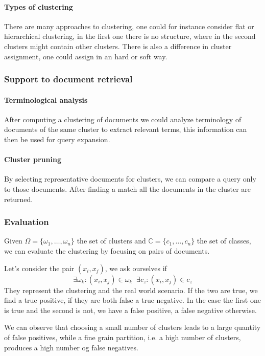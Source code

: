 \paragraph{Types of clustering}
There are many approaches to clustering, one could for instance 
consider flat or hierarchical clustering, in the first one there is no structure, where 
in the second clusters might contain other clusters. 
There is also a difference in cluster assignment, one could assign in an hard or soft way.

\subsubsection{Support to document retrieval}

\paragraph{Terminological analysis}
After computing a clustering of documents we could analyze terminology 
of documents of the same cluster to extract relevant terms, this 
information can then be used for query expansion.

\paragraph{Cluster pruning}
By selecting representative documents for clusters, we can compare a query 
only to those documents. After finding a match all the documents in the cluster 
are returned.

\subsubsection{Evaluation}
Given $\Omega = \{ \omega_1, \dots, \omega_n\}$ the set of clusters 
and $\mathbb{C} = \{ c_1, \dots, c_n\}$ the set of classes, we can evaluate 
the clustering by focusing on pairs of documents.

Let's consider the pair $(x_i, x_j)$, we ask ourselves if 
$$\exists \omega_k : (x_i, x_j) \in \omega_k\;\;\exists c_z : (x_i, x_j) \in c_z$$
They represent the clustering and the real world scenario.
If the two are true, we find a true positive, if they are both false a true negative.
In the case the first one is true and the second is not, we have a false positive, 
a false negative otherwise.

We can observe that choosing a small number of clusters leads to a large 
quantity of false positives, while a fine grain partition, i.e. a high number 
of clusters, produces a high number og false negatives.

